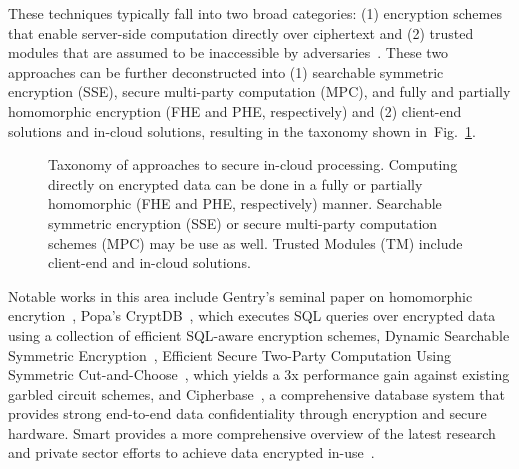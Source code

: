 \documentclass[notitlepage,longbibliography]{revtex4-1}
\newcommand{\figref}[1]{Fig.~\ref{#1}}
\begin{document}
These techniques typically fall into two broad categories: (1) encryption schemes that enable server-side computation directly over ciphertext and (2) trusted modules that are assumed to be inaccessible by adversaries~\cite{tutorial}. These two approaches can be further deconstructed into (1) searchable symmetric encryption (SSE), secure multi-party computation (MPC), and fully and partially homomorphic encryption (FHE and PHE, respectively) and (2) client-end solutions and in-cloud solutions, resulting in the taxonomy shown in~\figref{fig:taxonomy}.

\begin{figure}
	\begin{center}
	\end{center}
  \caption{Taxonomy of approaches to secure in-cloud processing.
    Computing directly on encrypted data can be done in a fully or partially homomorphic (FHE and PHE, respectively) manner.
    Searchable symmetric encryption (SSE) or secure multi-party computation schemes (MPC) may be use as well.
    Trusted Modules (TM) include client-end and in-cloud solutions.}
	\label{fig:taxonomy}
\end{figure}

Notable works in this area include Gentry's seminal paper on homomorphic encrytion~\cite{gentry}, Popa's CryptDB~\cite{cryptdb}, which executes SQL queries
over encrypted data using a collection of efficient SQL-aware encryption schemes, Dynamic Searchable Symmetric Encryption~\cite{dynamicsse}, Efficient Secure Two-Party Computation Using Symmetric Cut-and-Choose~\cite{mpc}, which yields a 3x performance gain against existing garbled circuit schemes, and Cipherbase~\cite{cryptdb}, a comprehensive database system that provides strong end-to-end data confidentiality through encryption and secure hardware.
Smart provides a more comprehensive overview of the latest research and private sector efforts to achieve data encrypted in-use~\cite{smart}.
\end{document}
